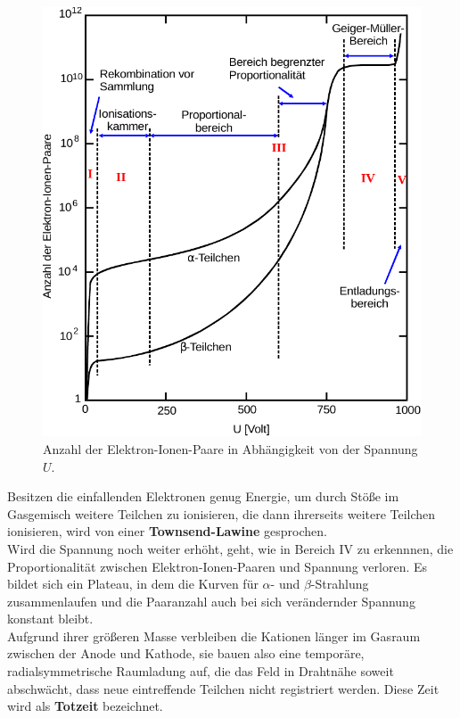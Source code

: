 \begin{figure}[H]
    \centering
    \includegraphics{figures/Abb_2.pdf}
    \caption{Anzahl der Elektron-Ionen-Paare in Abhängigkeit von der Spannung $U$\cite{ap03}.}
    \label{fig:abb2}
\end{figure}

Besitzen die einfallenden Elektronen genug
Energie, um durch Stöße im Gasgemisch weitere
Teilchen zu ionisieren, die dann ihrerseits weitere
Teilchen ionisieren, wird von einer \textbf{Townsend-Lawine}
gesprochen. \\

Wird die Spannung noch weiter erhöht, geht,
wie in Bereich IV zu erkennnen, die
Proportionalität zwischen Elektron-Ionen-Paaren
und Spannung verloren.
Es bildet sich ein Plateau, in dem die Kurven
für $\alpha$- und $\beta$-Strahlung zusammenlaufen
und die Paaranzahl auch bei sich verändernder
Spannung konstant bleibt. \\

Aufgrund ihrer größeren Masse verbleiben die Kationen
länger im Gasraum zwischen der Anode und Kathode, sie bauen
also eine temporäre, radialsymmetrische Raumladung auf,
die das Feld in Drahtnähe soweit abschwächt,
dass neue eintreffende Teilchen nicht registriert werden.
Diese Zeit wird als \textbf{Totzeit} bezeichnet. \\

